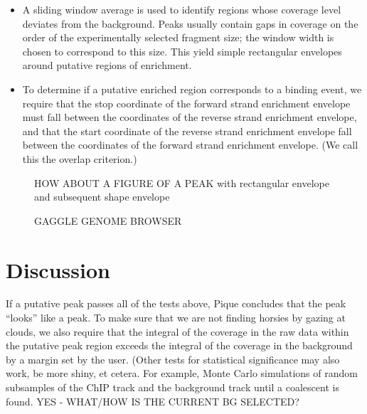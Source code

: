 \documentclass{bioinfo}
\begin{document}
\begin{methods}
\begin{itemize}
\item A sliding window average is used to identify regions whose
  coverage level deviates from the background. Peaks usually contain
  gaps in coverage on the order of the experimentally selected
  fragment size; the window width is chosen to correspond to this
  size. This yield simple rectangular envelopes around putative
  regions of enrichment. 

\item To determine if a putative enriched region corresponds to a
  binding event, we require that the stop coordinate of the forward
  strand enrichment envelope must fall between the coordinates of the
  reverse strand enrichment envelope, and that the start coordinate of
  the reverse strand enrichment envelope fall between the coordinates
  of the forward strand enrichment envelope. (We call this the overlap
  criterion.)

\end{itemize}


\end{methods}

\begin{figure}[!tfbd peak - a nice one]%
  \caption{HOW ABOUT A FIGURE OF A PEAK with rectangular envelope and
    subsequent shape envelope}\label{fig:01}
\end{figure}

\begin{figure}[!tfbd data - reasonable spot showing curation]%
\caption{GAGGLE GENOME BROWSER}\label{fig:02}
\end{figure}
\section{Discussion}

\noindent If a putative peak passes all of the tests above, Pique
concludes that the peak ``looks'' like a peak. To make sure that we
are not finding horsies by gazing at clouds, we also require that the
integral of the coverage in the raw data within the putative peak
region exceeds the integral of the coverage in the background by a
margin set by the user. (Other tests for statistical significance may
also work, be more shiny, et cetera. For example, Monte Carlo
simulations of random subsamples of the ChIP track and the background
track until a coalescent is found. YES - WHAT/HOW IS THE CURRENT BG
SELECTED?
\end{document}
